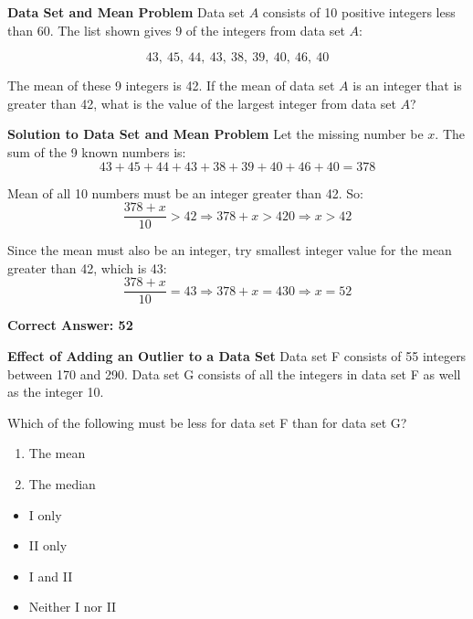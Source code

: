 \documentclass{beamer}
\begin{document}
\begin{frame}{\textbf{Data Set and Mean Problem}}
Data set \( A \) consists of 10 positive integers less than 60. The list shown gives 9 of the integers from data set \( A \):

\[
43,\ 45,\ 44,\ 43,\ 38,\ 39,\ 40,\ 46,\ 40
\]

The mean of these 9 integers is 42. If the mean of data set \( A \) is an integer that is greater than 42, what is the value of the largest integer from data set \( A \)?
\end{frame}


\begin{frame}{\textbf{Solution to Data Set and Mean Problem}}
Let the missing number be \( x \). The sum of the 9 known numbers is:
\[
43 + 45 + 44 + 43 + 38 + 39 + 40 + 46 + 40 = 378
\]

Mean of all 10 numbers must be an integer greater than 42. So:
\[
\frac{378 + x}{10} > 42 \Rightarrow 378 + x > 420 \Rightarrow x > 42
\]

Since the mean must also be an integer, try smallest integer value for the mean greater than 42, which is 43:
\[
\frac{378 + x}{10} = 43 \Rightarrow 378 + x = 430 \Rightarrow x = 52
\]

\textbf{Correct Answer: 52}
\end{frame}

\begin{frame}{\textbf{Effect of Adding an Outlier to a Data Set}}
Data set F consists of 55 integers between 170 and 290. Data set G consists of all the integers in data set F as well as the integer 10. 

Which of the following must be less for data set F than for data set G?

\begin{enumerate}
    \item The mean
    \item The median
\end{enumerate}

\begin{itemize}
    \item[A.] I only
    \item[B.] II only
    \item[C.] I and II
    \item[D.] Neither I nor II
\end{itemize}
\end{frame}
\end{document}
